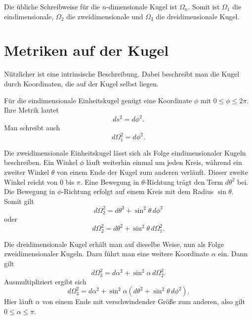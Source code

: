 Die übliche Schreibweise für die \(n\)-dimensionale Kugel ist \(\Omega_n\). Somit ist \(\Omega_1\) die eindimensionale, \(\Omega_2\) die zweidimensionale und \(\Omega_3\) die dreidimensionale Kugel.

\section{Metriken auf der Kugel}

Nützlicher ist eine intrinsische Beschreibung. Dabei beschreibt man die Kugel durch Koordinaten, die auf der Kugel selbst liegen.

Für die eindimensionale Einheitskugel genügt eine Koordinate \(\phi\) mit \(0\leq \phi \leq 2\pi\). Ihre Metrik lautet
\begin{equation}
ds^2=d\phi^2.
\end{equation}
Man schreibt auch
\begin{equation}
d\Omega_1^2=d\phi^2.
\end{equation}

Die zweidimensionale Einheitskugel lässt sich als Folge eindimensionaler Kugeln beschreiben. Ein Winkel \(\phi\) läuft weiterhin einmal um jeden Kreis, während ein zweiter Winkel \(\theta\) von einem Ende der Kugel zum anderen verläuft. Dieser zweite Winkel reicht von \(0\) bis \(\pi\). Eine Bewegung in \(\theta\)-Richtung trägt den Term \(d\theta^2\) bei. Die Bewegung in \(\phi\)-Richtung erfolgt auf einem Kreis mit dem Radius \(\sin\theta\). Somit gilt
\begin{equation}
d\Omega_2^2=d\theta^2+\sin^2\theta\,d\phi^2
\end{equation}
oder
\begin{equation}
d\Omega_2^2=d\theta^2+\sin^2\theta\,d\Omega_1^2.
\end{equation}

Die dreidimensionale Kugel erhält man auf dieselbe Weise, nun als Folge zweidimensionaler Kugeln. Dazu führt man eine weitere Koordinate \(\alpha\) ein. Dann gilt
\begin{equation}
d\Omega_3^2=d\alpha^2+\sin^2\alpha\,d\Omega_2^2.
\end{equation}
Ausmultipliziert ergibt sich
\begin{equation}
d\Omega_3^2=d\alpha^2+\sin^2\alpha\left(d\theta^2+\sin^2\theta\,d\phi^2\right).
\end{equation}
Hier läuft \(\alpha\) von einem Ende mit verschwindender Größe zum anderen, also gilt \(0\leq \alpha \leq \pi\).

